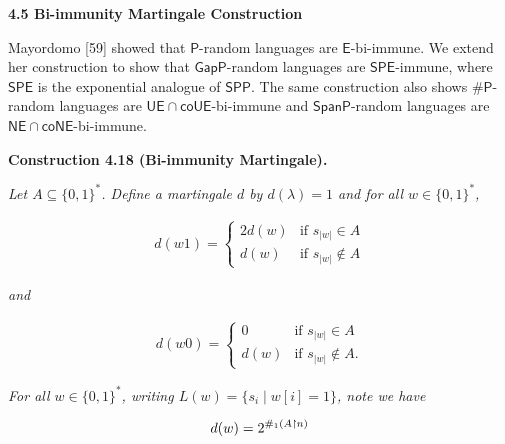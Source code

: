 




\par\medskip\noindent\textbf{
4.5 Bi-immunity Martingale Construction}\par




Mayordomo [59] showed that $\mathsf{P}$-random languages are $\mathsf{E}$-bi-immune. We extend her construction to show that $\mathsf{GapP}$-random languages are $\mathsf{SPE}$-immune, where $\mathsf{SPE}$ is the exponential analogue of $\mathsf{SPP}$.
The same construction also shows ${\mathsf{\#}\mathsf{P}}$-random languages are $\mathsf{UE}\cap\mathsf{co}\mathsf{UE}$-bi-immune and $\mathsf{SpanP}$-random languages are $\mathsf{NE}\cap\mathsf{co}\mathsf{NE}$-bi-immune.\par





\par\medskip\noindent\textbf{
\textbf{Construction 4.18}\textbf{ }(Bi-immunity Martingale)\textbf{.}
}\par



\emph{Let $A\subseteq\{0,1\}^{*}$. Define a martingale $d$ by $d(\lambda)=1$ and for all $w\in\{0,1\}^{*}$,}\par


\[\begin{gathered}
d(w1)=\begin{cases}2d(w)&\textrm{if }s_{|w|}\in A\\
d(w)&\textrm{if }s_{|w|}\not\in A\end{cases}
\end{gathered}\]


\emph{and}\par


\[\begin{gathered}
d(w0)=\begin{cases}0&\textrm{if }s_{|w|}\in A\\
d(w)&\textrm{if }s_{|w|}\not\in A.\end{cases}
\end{gathered}\]


\emph{For all $w\in\{0,1\}^{*}$, writing $L(w)=\{s_{i}\mid w[i]=1\}$,
note we have}\par


\[\begin{gathered}
d(w)=2^{\#_{1}(A\thinspace\negthinspace\upharpoonright\negthinspace\thinspace n)}
\end{gathered}\]


